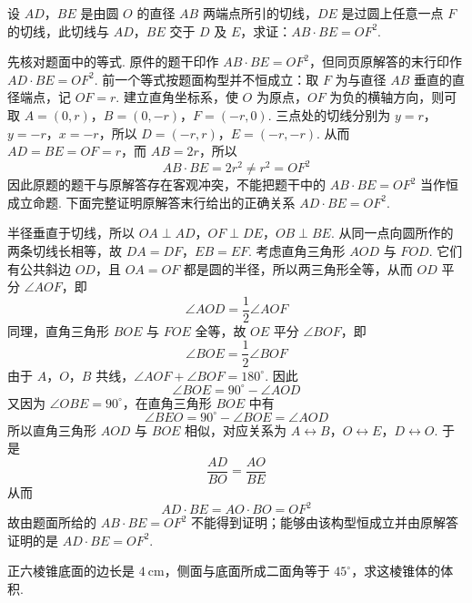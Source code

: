 \begin{problem}
设 \(AD\)，\(BE\) 是由圆 \(O\) 的直径 \(AB\) 两端点所引的切线，\(DE\) 是过圆上任意一点 \(F\) 的切线，此切线与 \(AD\)，\(BE\) 交于 \(D\) 及 \(E\)，求证：\(AB\cdot BE=OF^{2}\).
\end{problem}

\begin{solution}

先核对题面中的等式. 原件的题干印作 \(AB\cdot BE=OF^{2}\)，但同页原解答的末行印作 \(AD\cdot BE=OF^{2}\). 前一个等式按题面构型并不恒成立：取 \(F\) 为与直径 \(AB\) 垂直的直径端点，记 \(OF=r\). 建立直角坐标系，使 \(O\) 为原点，\(OF\) 为负的横轴方向，则可取
\(A=(0,r)\)，\(B=(0,-r)\)，\(F=(-r,0)\).
三点处的切线分别为 \(y=r\)，\(y=-r\)，\(x=-r\)，所以 \(D=(-r,r)\)，\(E=(-r,-r)\). 从而 \(AD=BE=OF=r\)，而 \(AB=2r\)，所以
\[
AB\cdot BE=2r^{2}\ne r^{2}=OF^{2}
\]
因此原题的题干与原解答存在客观冲突，不能把题干中的 \(AB\cdot BE=OF^{2}\) 当作恒成立命题. 下面完整证明原解答末行给出的正确关系 \(AD\cdot BE=OF^{2}\).

半径垂直于切线，所以 \(OA\perp AD\)，\(OF\perp DE\)，\(OB\perp BE\). 从同一点向圆所作的两条切线长相等，故
\(DA=DF\)，\(EB=EF\).
考虑直角三角形 \(AOD\) 与 \(FOD\). 它们有公共斜边 \(OD\)，且 \(OA=OF\) 都是圆的半径，所以两三角形全等，从而 \(OD\) 平分 \(\angle AOF\)，即
\[
\angle AOD=\frac{1}{2}\angle AOF
\]
同理，直角三角形 \(BOE\) 与 \(FOE\) 全等，故 \(OE\) 平分 \(\angle BOF\)，即
\[
\angle BOE=\frac{1}{2}\angle BOF
\]
由于 \(A\)，\(O\)，\(B\) 共线，\(\angle AOF+\angle BOF=180^{\circ}\). 因此
\[
\angle BOE=90^{\circ}-\angle AOD
\]
又因为 \(\angle OBE=90^{\circ}\)，在直角三角形 \(BOE\) 中有
\[
\angle BEO=90^{\circ}-\angle BOE=\angle AOD
\]
所以直角三角形 \(AOD\) 与 \(BOE\) 相似，对应关系为 \(A\leftrightarrow B\)，\(O\leftrightarrow E\)，\(D\leftrightarrow O\). 于是
\[
\frac{AD}{BO}=\frac{AO}{BE}
\]
从而
\[
AD\cdot BE=AO\cdot BO=OF^{2}
\]
故由题面所给的 \(AB\cdot BE=OF^{2}\) 不能得到证明；能够由该构型恒成立并由原解答证明的是 \(AD\cdot BE=OF^{2}\).
\end{solution}

\begin{problem}
正六棱锥底面的边长是 \(4\mathrm{~cm}\)，侧面与底面所成二面角等于 \(45^{\circ}\)，求这棱锥体的体积.
\end{problem}

